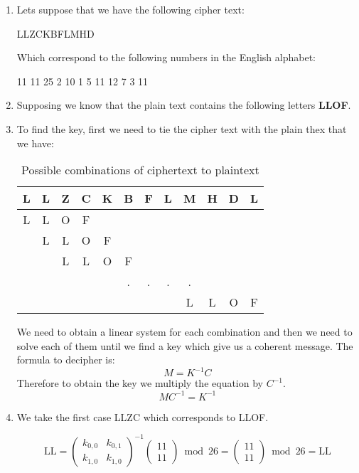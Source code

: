 \documentclass[titlepage, 12pt]{article}
\numberwithin{equation}{section}%
\numberwithin{figure}{section}%
\numberwithin{table}{section}%
\begin{document}
		\begin{enumerate}
		\item Lets suppose that we have the following cipher text:
		\begin{center}
			LLZCKBFLMHD
		\end{center} 
		
		Which correspond to the following numbers in the English alphabet:
		\begin{center}
			11 11 25 2 10 1 5 11 12 7 3 11
		\end{center} 
		\item Supposing we know that the plain text contains the following letters \textbf{LLOF}.
		\item To find the key, first we need to tie the cipher text with the plain thex that we have:
		
		\begin{table}[H]
			\centering
			\caption{Possible combinations of ciphertext to plaintext}
			\begin{tabular}{|c|c|c|c|c|c|c|c|c|c|c|c|}
				\hline
				L & L & Z & C & K & B & F & L & M & H & D & L \\ \hline
				L & L & O & F &   &   &   &   &   &   &   &  \\ \hline
				  & L & L & O & F &   &   &   &   &   &   &  \\ \hline
				  &   & L & L & O & F &   &   &   &   &   &  \\ \hline
				  &   &   &   &   & . & . & . & . &   &   &  \\ \hline
				  &   &   &   &   &   &   &   & L & L & O & F \\ \hline
			\end{tabular}
			
		\end{table}
		
		We need to obtain a linear system for each combination and then we need to solve each of them until we find a key which give us a coherent message.
		The formula to decipher is:
		\begin{equation}
			M = K^{-1}C
		\end{equation}
		Therefore to obtain the key we multiply the equation by $C^{-1}$.
		\begin{equation}
			MC^{-1} = K^{-1}
		\end{equation}
		\item We take the first case LLZC which corresponds to LLOF.
		
		\begin{equation}
			\text{LL} = 
			\begin{pmatrix}
			k_{0,0} & k_{0,1} \\
			k_{1,0} & k_{1,0}
			\end{pmatrix}^{-1}
			\begin{pmatrix}
				11 \\
				11
			\end{pmatrix}
			\bmod{26} = 
			\begin{pmatrix}
			11 \\
			11 
			\end{pmatrix}
			\bmod{26} = \text{LL}
		\end{equation}
		

\end{enumerate}
\end{document}
